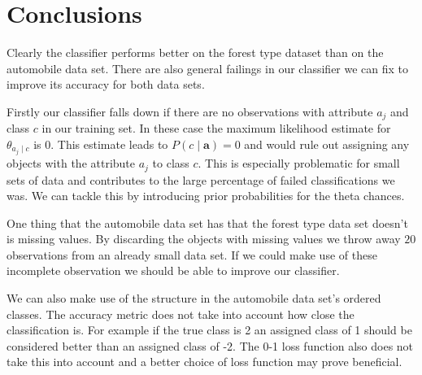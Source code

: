 \section{Conclusions}

Clearly the classifier performs better on the forest type dataset than on the automobile data set.
There are also general failings in our classifier we can fix to improve its accuracy for both data sets.

Firstly our classifier falls down if there are no observations with attribute $a_j$ and class $c$ in our training set.
In these case the maximum likelihood estimate for $\theta_{a_j \mid c}$ is $0$.
This estimate leads to $P(c \mid \mathbf{a}) = 0$ and would rule out assigning any objects with the attribute $a_j$ to class $c$.
This is especially problematic for small sets of data and contributes to the large percentage of failed classifications we was.
We can tackle this by introducing prior probabilities for the theta chances.

One thing that the automobile data set has that the forest type data set doesn't is missing values.
By discarding the objects with missing values we throw away $20$ observations from an already small data set.
If we could make use of these incomplete observation we should be able to improve our classifier.

We can also make use of the structure in the automobile data set's ordered classes.
The accuracy metric does not take into account how close the classification is.
For example if the true class is 2 an assigned class of 1 should be considered better than an assigned class of -2.
The 0-1 loss function also does not take this into account and a better choice of loss function may prove beneficial.

